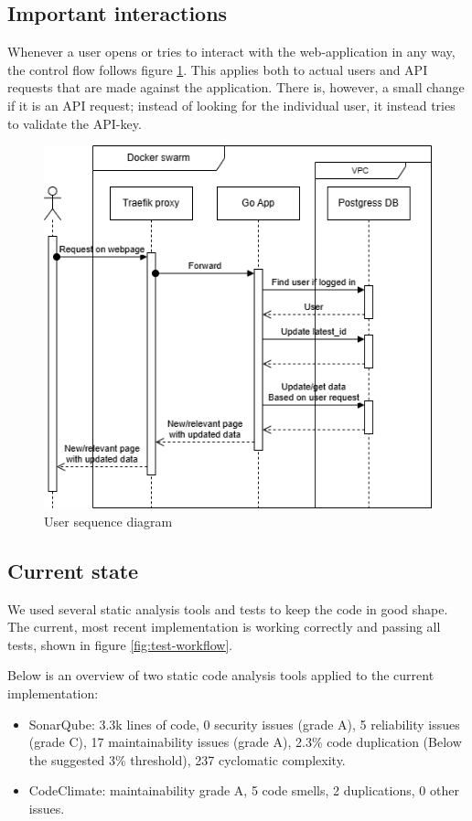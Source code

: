 \subsection{Important interactions} 
Whenever a user opens or tries to interact with the web-application in any way, the control flow follows figure \ref{fig:user-seq}. This applies both to actual users and API requests that are made against the application. There is, however, a small change if it is an API request; instead of looking for the individual user, it instead tries to validate the API-key.

\begin{figure}[h!]
  \centering
  \includegraphics[width=\textwidth]{images/User seq dia.png}
  \caption{User sequence diagram}
  \label{fig:user-seq}
\end{figure}


\subsection{Current state}
We used several static analysis tools and tests to keep the
code in good shape. The current, most recent implementation
is working correctly and passing all tests, shown in figure \ref{fig:test-workflow}.

Below is an overview of two static code analysis tools applied to the current implementation:
\begin{itemize}
    \item SonarQube: 3.3k lines of code, 0 security issues (grade A), 5 reliability issues
    (grade C), 17 maintainability issues (grade A), 2.3\% code duplication
    (Below the suggested 3\% threshold), 237 cyclomatic complexity.
    \item CodeClimate: maintainability grade A, 5 code smells, 2 duplications,
    0 other issues.
\end{itemize}
